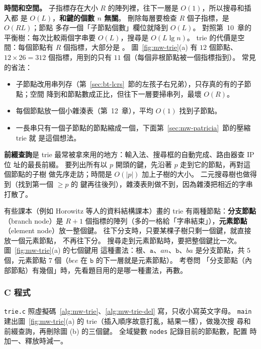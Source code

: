 \textbf{時間和空間。} 子指標存在大小 $R$ 的陣列裡，往下一層是 $O(1)$，所以搜尋和插入都
是 $O(L)$，\textbf{和鍵的個數 $n$ 無關}。 刪除每層要檢查 $R$ 個子指標，是 $O(RL)$；節點
多存一個「子節點個數」欄位就降到 $O(L)$。 對照第~10~章的平衡樹：每次比較兩個字串要
$O(L)$，搜尋是 $O(L \lg n)$。 trie 的代價是空間：每個節點有 $R$ 個指標，大部分是
\NIL。 圖~\ref{fig:mw-trie}(a) 有 $12$ 個節點、$12 \times 26 = 312$ 個指標，用到的只有
$11$ 個（每個非根節點被一個指標指到）。 常見的省法：
\begin{itemize}
\item 子節點改用串列存（第~\ref{sec:bt-lcrs}~節的左孩子右兄弟），只存真的有的子節點；空間
降到和節點數成正比，但往下一層要掃串列，最壞 $O(R)$。
\item 每個節點放一個小雜湊表（第~12~章），平均 $O(1)$ 找到子節點。
\item 一長串只有一個子節點的節點縮成一個，下面第~\ref{sec:mw-patricia}~節的壓縮 trie 就
是這個想法。
\end{itemize}

\textbf{前綴查詢}是 trie 最常被拿來用的地方：輸入法、搜尋框的自動完成、路由器查 IP 位
址的最長前綴。 要列出所有以 $p$ 開頭的鍵，先沿著 $p$ 走到它的節點，再對這個節點的子樹
做先序走訪；時間是 $O(|p|)$ 加上子樹的大小。 二元搜尋樹也做得到（找到第一個 $\ge p$ 的
鍵再往後列），雜湊表則做不到，因為雜湊把相近的字串打散了。

\begin{examnote}
有些課本（例如 Horowitz 等人的資料結構課本）畫的 trie 有兩種節點：\textbf{分支節點}
（branch node）是 $R + 1$ 個指標的陣列（多的一格給「字串結束」），\textbf{元素節點}
（element node）放一整個鍵。 往下分支時，只要某棵子樹只剩一個鍵，就直接放一個元素節點，
不再往下分。 搜尋走到元素節點時，要把整個鍵比一次。 圖~\ref{fig:mw-trie}(a) 的七個鍵用
這種畫法：根、$\mathtt{a}$、$\mathit{an}$、$\mathtt{b}$、$\mathit{ba}$ 是分支節點，共 $5$
個，元素節點 $7$ 個（$\mathit{bee}$ 在 $\mathtt{b}$ 的下一層就是元素節點）。 考卷問
「分支節點（內部節點）有幾個」時，先看題目用的是哪一種畫法，再數。
\end{examnote}

\subsubsection{C 程式}

\texttt{trie.c} 照虛擬碼~\ref{alg:mw-trie}、\ref{alg:mw-trie-del} 寫，只收小寫英文字母。
\texttt{main} 建出圖~\ref{fig:mw-trie}(a) 的 trie（插入順序故意打亂，結果一樣），做幾次搜
尋和前綴查詢，再刪除圖 (b) 的三個鍵。 全域變數 \texttt{nodes} 記錄目前的節點數，配置
時加一、釋放時減一。

